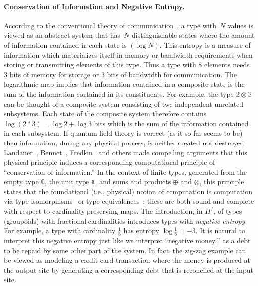 \documentclass[a4paper,USenglish]{lipics-v2016-utf8x}
\newcommand{\pifrac}{\ensuremath{\Pi^/}}
\newcommand{\zt}{\mathbb{0}}
\newcommand{\ot}{\mathbb{1}}
\begin{document}
\paragraph*{Conservation of Information and Negative Entropy.} According to the
conventional theory of communication~\cite{Shannon1948}, a type with~$N$ values
is viewed as an abstract system that has~$N$ distinguishable states where the
amount of information contained in each state is $(\log{N})$. This entropy is a
measure of information which materializes itself in memory or bandwidth
requirements when storing or transmitting elements of this type. Thus a type
with $8$ elements needs $3$ bits of memory for storage or $3$ bits of bandwidth
for communication. The logarithmic map implies that information contained in a
composite state is the sum of the information contained in its constituents. For
example, the type $\mathbb{2} \otimes \mathbb{3}$ can be thought of a composite
system consisting of two independent unrelated subsystems. Each state of the
composite system therefore contains $\log (2 * 3) = \log 2 + \log 3$ bits which
is the sum of the information contained in each subsystem. If quantum field
theory is correct (as it so far seems to be) then information, during any
physical process, is neither created nor
destroyed. Landauer~\cite{Landauer:1961,bennett1985fundamental,Landauer},
Bennet~\cite{Bennett:1973:LRC,bennett2003notes,bennett2010notes},
Fredkin~\cite{fredkin1982conservative} and others made compelling arguments that
this physical principle induces a corresponding computational principle of
``conservation of information.'' In the context of finite types, generated from
the empty type $\zt$, the unit type $\ot$, and sums and products $\oplus$ and
$\otimes$, this principle states that the foundational (i.e., physical) notion
of computation is computation via type
isomorphisms~\cite{James:2012:IE:2103656.2103667} or type
equivalences~\cite{Carette2016}; these are both sound and complete with respect
to cardinality-preserving maps. The introduction, in $\pifrac$, of types
(groupoids) with fractional cardinalities introduces types with \emph{negative
  entropy}. For example, a type with cardinality $\frac{1}{8}$ has entropy
$\log{\frac{1}{8}} = -3$. It is natural to interpret this negative entropy just
like we interpret ``negative money,'' as a debt to be repaid by some other part
of the system. In fact, the zig-zag example can be viewed as modeling a credit
card transaction where the money is produced at the output site by generating a
corresponding debt that is reconciled at the input site.
\end{document}
